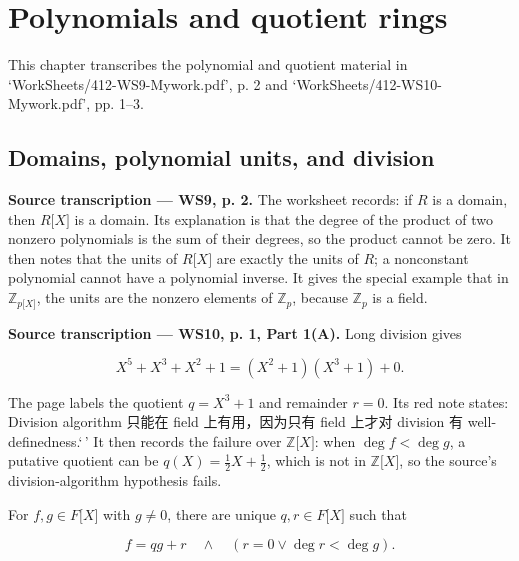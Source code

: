 \chapter{Polynomials and quotient rings}\label{polynomials-and-quotients}

This chapter transcribes the polynomial and quotient material in `WorkSheets/412-WS9-Mywork.pdf', p. 2 and `WorkSheets/412-WS10-Mywork.pdf', pp. 1--3.

\section{Domains, polynomial units, and division}

\textbf{Source transcription --- WS9, p. 2.} The worksheet records: if \(R\) is a domain, then \(R\lbrack X\rbrack\) is a domain. Its explanation is that the degree of the product of two nonzero polynomials is the sum of their degrees, so the product cannot be zero. It then notes that the units of \(R\lbrack X\rbrack\) are exactly the units of \(R\); a nonconstant polynomial cannot have a polynomial inverse. It gives the special example that in \(\mathbb{Z}_{p{\lbrack X\rbrack}}\), the units are the nonzero elements of \(\mathbb{Z}_{p}\), because \(\mathbb{Z}_{p}\) is a field.

\textbf{Source transcription --- WS10, p. 1, Part 1(A).} Long division gives

\[X^{5} + X^{3} + X^{2} + 1 = \left( {X^{2} + 1} \right)\left( {X^{3} + 1} \right) + 0.\]

The page labels the quotient \(q = X^{3} + 1\) and remainder \(r = 0\). Its red note states: Division algorithm 只能在 field 上有用，因为只有 field 上才对 division 有 well-definedness.`\,' It then records the failure over \(\mathbb{Z}\lbrack X\rbrack\): when \(\deg f < \deg g\), a putative quotient can be \(q(X) = \frac{1}{2}X + \frac{1}{2}\), which is not in \(\mathbb{Z}\lbrack X\rbrack\), so the source's division-algorithm hypothesis fails.

\begin{theorem}{}

For \(f,g \in F\lbrack X\rbrack\) with \(g \neq 0\), there are unique \(q,r \in F\lbrack X\rbrack\) such that

\[f = qg + r\quad \land \quad\left( {r = 0 \vee \deg r < \deg g} \right).\]

\end{theorem}

